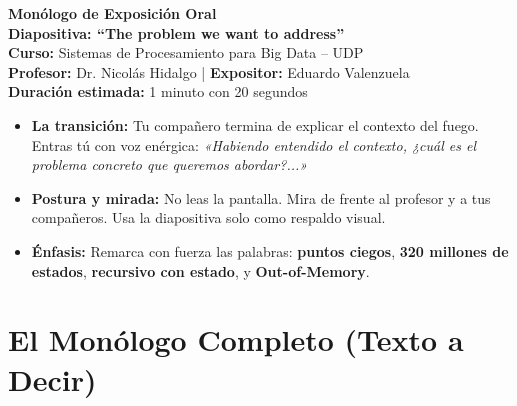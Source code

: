 \documentclass[12pt,a4paper]{article}
\begin{document}
\begin{center}
    {\Huge\textbf{\color{primaryblue}Monólogo de Exposición Oral}}\\[0.4em]
    {\Large\textbf{Diapositiva: ``The problem we want to address''}}\\[0.3em]
    \textbf{Curso:} Sistemas de Procesamiento para Big Data -- UDP\\
    \textbf{Profesor:} Dr. Nicolás Hidalgo \quad | \quad \textbf{Expositor:} Eduardo Valenzuela\\
    \textbf{Duración estimada:} 1 minuto con 20 segundos
\end{center}

\vspace{0.3cm}

\begin{actionbox}
\begin{itemize}[leftmargin=5mm, itemsep=3pt]
    \item \textbf{La transición:} Tu compañero termina de explicar el contexto del fuego. Entras tú con voz enérgica: \textit{«Habiendo entendido el contexto, ¿cuál es el problema concreto que queremos abordar?...»}
    \item \textbf{Postura y mirada:} No leas la pantalla. Mira de frente al profesor y a tus compañeros. Usa la diapositiva solo como respaldo visual.
    \item \textbf{Énfasis:} Remarca con fuerza las palabras: \textbf{puntos ciegos}, \textbf{320 millones de estados}, \textbf{recursivo con estado}, y \textbf{Out-of-Memory}.
\end{itemize}
\end{actionbox}

\vspace{0.2cm}

\section{El Monólogo Completo (Texto a Decir)}
\end{document}
